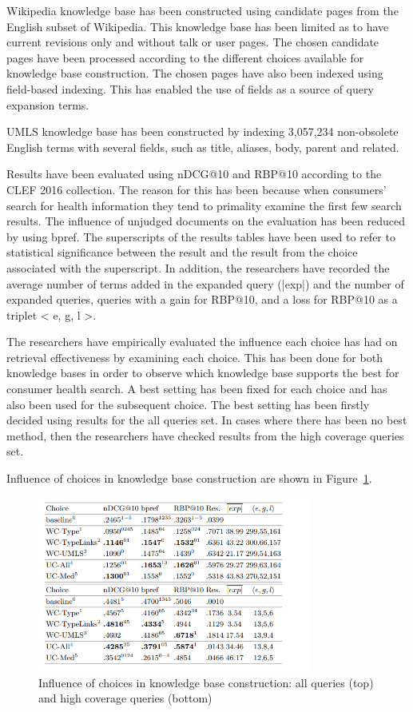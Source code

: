 \documentclass[]{article}
\begin{document}
Wikipedia knowledge base has been constructed using candidate pages from the English subset of Wikipedia. This knowledge base has been limited as to have current revisions only and without talk or user pages. The chosen candidate pages have been processed according to the different choices available for knowledge base construction. The chosen pages have also been indexed using field-based indexing. This has enabled the use of fields as a source of query expansion terms.     

UMLS knowledge base has been constructed by indexing 3,057,234 non-obsolete English terms with several fields, such as title, aliases, body, parent and related.

Results have been evaluated using nDCG@10 and RBP@10 according to the CLEF 2016 collection. The reason for this has been because when consumers’ search for health information they tend to primality examine the first few search results. The influence of unjudged documents on the evaluation has been reduced by using bpref. The superscripts of the results tables have been used to refer to statistical significance between the result and the result from the choice associated with the superscript. In addition, the researchers have recorded the average number of terms added in the expanded query (|exp|) and the number of expanded queries, queries with a gain for RBP@10, and a loss for RBP@10 as a triplet < e, g, l >.  

The researchers have empirically evaluated the influence each choice has had on retrieval effectiveness by examining each choice. This has been done for both knowledge bases in order to observe which knowledge base supports the best for consumer health search. A best setting has been fixed for each choice and has also been used for the subsequent choice. The best setting has been firstly decided using results for the all queries set. In cases where there has been no best method, then the researchers have checked results from the high coverage queries set.           

Influence of choices in knowledge base construction are shown in Figure~\ref{fig28}.

\begin{figure}[t!]
	\includegraphics[width=0.8\textwidth]{Capture28.png}
	\caption{Influence of choices in knowledge base construction: all queries (top) and high coverage
		queries (bottom) \label{fig28}}
\end{figure} 
\end{document}
